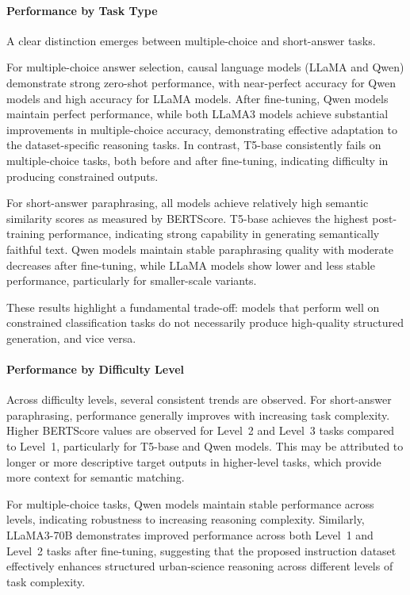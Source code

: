 \documentclass[a4paper,fleqn]{cas-sc}
\begin{document}
\paragraph{Performance by Task Type}

A clear distinction emerges between multiple-choice and short-answer tasks. 

For multiple-choice answer selection, causal language models (LLaMA and Qwen) demonstrate strong zero-shot performance, with near-perfect accuracy for Qwen models and high accuracy for LLaMA models. After fine-tuning, Qwen models maintain perfect performance, while both LLaMA3 models achieve substantial improvements in multiple-choice accuracy, demonstrating effective adaptation to the dataset-specific reasoning tasks. In contrast, T5-base consistently fails on multiple-choice tasks, both before and after fine-tuning, indicating difficulty in producing constrained outputs.

For short-answer paraphrasing, all models achieve relatively high semantic similarity scores as measured by BERTScore. T5-base achieves the highest post-training performance, indicating strong capability in generating semantically faithful text. Qwen models maintain stable paraphrasing quality with moderate decreases after fine-tuning, while LLaMA models show lower and less stable performance, particularly for smaller-scale variants.

These results highlight a fundamental trade-off: models that perform well on constrained classification tasks do not necessarily produce high-quality structured generation, and vice versa.

\paragraph{Performance by Difficulty Level}

Across difficulty levels, several consistent trends are observed. For short-answer paraphrasing, performance generally improves with increasing task complexity. Higher BERTScore values are observed for Level~2 and Level~3 tasks compared to Level~1, particularly for T5-base and Qwen models. This may be attributed to longer or more descriptive target outputs in higher-level tasks, which provide more context for semantic matching.

For multiple-choice tasks, Qwen models maintain stable performance across levels, indicating robustness to increasing reasoning complexity. Similarly, LLaMA3-70B demonstrates improved performance across both Level~1 and Level~2 tasks after fine-tuning, suggesting that the proposed instruction dataset effectively enhances structured urban-science reasoning across different levels of task complexity.
\end{document}
